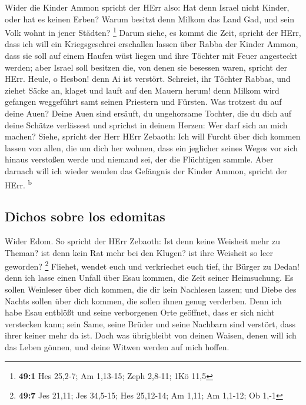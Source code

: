  Wider die Kinder Ammon spricht der HErr also: Hat denn
Israel nicht Kinder, oder hat es keinen Erben? Warum besitzt denn Milkom
das Land Gad, und sein Volk wohnt in jener Städten? \footnote{\textbf{49:1}
  Hes 25,2-7; Am 1,13-15; Zeph 2,8-11; 1Kö 11,5}  Darum
siehe, es kommt die Zeit, spricht der HErr, dass ich will ein
Kriegsgeschrei erschallen lassen über Rabba der Kinder Ammon, dass sie
soll auf einem Haufen wüst liegen und ihre Töchter mit Feuer angesteckt
werden; aber Israel soll besitzen die, von denen sie besessen waren,
spricht der HErr.  Heule, o Hesbon! denn Ai ist verstört.
Schreiet, ihr Töchter Rabbas, und ziehet Säcke an, klaget und lauft auf
den Mauern herum! denn Milkom wird gefangen weggeführt samt seinen
Priestern und Fürsten.  Was trotzest du auf deine Auen?
Deine Auen sind ersäuft, du ungehorsame Tochter, die du dich auf deine
Schätze verlässest und sprichst in deinem Herzen: Wer darf sich an mich
machen?  Siehe, spricht der Herr HErr Zebaoth: Ich will
Furcht über dich kommen lassen von allen, die um dich her wohnen, dass
ein jeglicher seines Weges vor sich hinaus verstoßen werde und niemand
sei, der die Flüchtigen sammle.  Aber darnach will ich
wieder wenden das Gefängnis der Kinder Ammon, spricht der HErr.
\textsuperscript{b}

\hypertarget{dichos-sobre-los-edomitas}{%
\subsection{Dichos sobre los edomitas}\label{dichos-sobre-los-edomitas}}

 Wider Edom. So spricht der HErr Zebaoth: Ist denn keine
Weisheit mehr zu Theman? ist denn kein Rat mehr bei den Klugen? ist ihre
Weisheit so leer geworden? \footnote{\textbf{49:7} Jes 21,11; Jes
  34,5-15; Hes 25,12-14; Am 1,11; Am 1,1-12; Ob 1,-1} 
Fliehet, wendet euch und verkriechet euch tief, ihr Bürger zu Dedan!
denn ich lasse einen Unfall über Esau kommen, die Zeit seiner
Heimsuchung.  Es sollen Weinleser über dich kommen, die
dir kein Nachlesen lassen; und Diebe des Nachts sollen über dich kommen,
die sollen ihnen genug verderben.  Denn ich habe Esau
entblößt und seine verborgenen Orte geöffnet, dass er sich nicht
verstecken kann; sein Same, seine Brüder und seine Nachbarn sind
verstört, dass ihrer keiner mehr da ist.  Doch was
übrigbleibt von deinen Waisen, denen will ich das Leben gönnen, und
deine Witwen werden auf mich hoffen.

